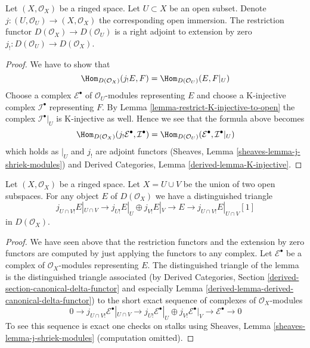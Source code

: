 \begin{lemma}
\label{lemma-adjoint-lower-shriek-restrict}
Let $(X, \mathcal{O}_X)$ be a ringed space. Let $U \subset X$ be an
open subset. Denote $j : (U, \mathcal{O}_U) \to (X, \mathcal{O}_X)$
the corresponding open immersion. The restriction functor
$D(\mathcal{O}_X) \to D(\mathcal{O}_U)$ is a right adjoint to
extension by zero $j_! : D(\mathcal{O}_U) \to D(\mathcal{O}_X)$.
\end{lemma}

\begin{proof}
We have to show that
$$
\Hom_{D(\mathcal{O}_X)}(j_!E, F) = \Hom_{D(\mathcal{O}_U)}(E, F|_U)
$$
Choose a complex $\mathcal{E}^\bullet$ of $\mathcal{O}_U$-modules
representing $E$ and choose
a K-injective complex $\mathcal{I}^\bullet$ representing $F$.
By Lemma \ref{lemma-restrict-K-injective-to-open} the complex
$\mathcal{I}^\bullet|_U$ is K-injective as well. Hence we see that
the formula above becomes
$$
\Hom_{D(\mathcal{O}_X)}(j_!\mathcal{E}^\bullet, \mathcal{I}^\bullet) =
\Hom_{D(\mathcal{O}_U)}(\mathcal{E}^\bullet, \mathcal{I}^\bullet|_U)
$$
which holds as $|_U$ and $j_!$ are adjoint functors
(Sheaves, Lemma \ref{sheaves-lemma-j-shriek-modules}) and
Derived Categories, Lemma \ref{derived-lemma-K-injective}.
\end{proof}

\begin{lemma}
\label{lemma-exact-sequence-lower-shriek}
Let $(X, \mathcal{O}_X)$ be a ringed space.
Let $X = U \cup V$ be the union of two open subspaces.
For any object $E$ of $D(\mathcal{O}_X)$ we have a distinguished
triangle
$$
j_{U \cap V!}E|_{U \cap V} \to
j_{U!}E|_U \oplus j_{V!}E|_V \to E \to 
j_{U \cap V!}E|_{U \cap V}[1]
$$
in $D(\mathcal{O}_X)$.
\end{lemma}

\begin{proof}
We have seen above that the restriction functors and the extension
by zero functors are computed by just applying the functors to
any complex. Let $\mathcal{E}^\bullet$ be a complex of $\mathcal{O}_X$-modules
representing $E$. The distinguished triangle of the lemma is the
distinguished triangle associated (by
Derived Categories, Section
\ref{derived-section-canonical-delta-functor} and especially
Lemma \ref{derived-lemma-derived-canonical-delta-functor})
to the short exact sequence of complexes of $\mathcal{O}_X$-modules
$$
0 \to j_{U \cap V!}\mathcal{E}^\bullet|_{U \cap V} \to
j_{U!}\mathcal{E}^\bullet|_U \oplus j_{V!}\mathcal{E}^\bullet|_V
\to \mathcal{E}^\bullet \to 0
$$
To see this sequence is exact one checks on stalks using
Sheaves, Lemma \ref{sheaves-lemma-j-shriek-modules}
(computation omitted).
\end{proof}

